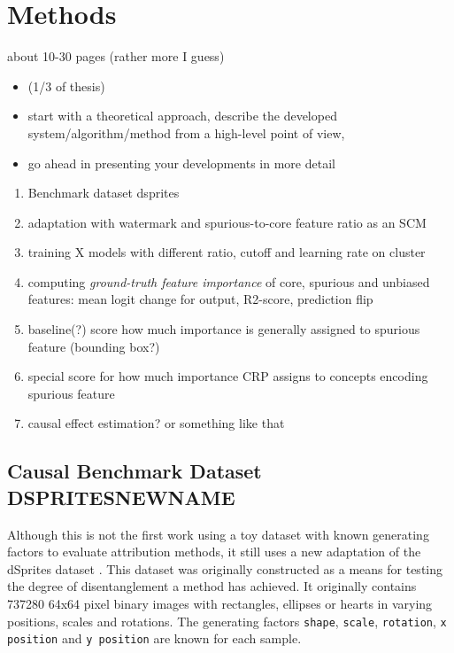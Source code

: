 \chapter{Methods}\label{chapter:method}

{ \color{red}

    about 10-30 pages (rather more I guess)

    \begin{itemize}
        \item (1/3 of thesis)
        \item start with a theoretical approach, describe the developed system/algorithm/method from a high-level point of view,
        \item go ahead in presenting your developments in more detail
    \end{itemize}
}


\begin{enumerate}
    \item Benchmark dataset dsprites
    \item adaptation with watermark and spurious-to-core feature ratio as an SCM
    \item training X models with different ratio, cutoff and learning rate on cluster
    \item computing \textit{ground-truth feature importance} of core, spurious and unbiased features: mean logit change for output, R2-score,  prediction flip
    \item baseline(?) score how much importance is generally assigned to spurious feature (bounding box?)
    \item special score for how much importance CRP assigns to concepts encoding spurious feature
    \item causal effect estimation? or something like that
\end{enumerate}


\section{Causal Benchmark Dataset DSPRITESNEWNAME}\label{section:causal_model}
Although this is not the first work using a toy dataset with known generating factors to evaluate attribution methods, it still uses a new adaptation of the dSprites dataset \cite{dsprites17}. This dataset was originally constructed as a means for testing the degree of disentanglement a method has achieved. It originally contains 737280 64x64 pixel binary images with rectangles, ellipses or hearts in varying positions, scales and rotations. The generating factors \verb|shape|, \verb|scale|, \verb|rotation|, \verb|x position| and \verb|y position| are known for each sample.

